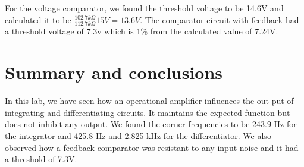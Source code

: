\documentclass[11pt,letterpaper,onecolumn]{article}
\begin{document}
For the voltage comparator, we found the threshold voltage to be 14.6V and calculated it to be $\frac{102.7k\Omega}{112.7k\Omega}15V=13.6V$. The comparator circuit with feedback had a threshold voltage of 7.3v which is 1\% from the calculated value of 7.24V.

\section{Summary and conclusions}

In this lab, we have seen how an operational amplifier influences the out put of integrating and differentiating circuits. It maintains the expected function but does not inhibit any output. We found the corner frequencies to be 243.9 Hz for the integrator and 425.8 Hz and 2.825 kHz for the differentiator. We also observed how a feedback comparator was resistant to any input noise and it had a threshold of 7.3V. 






\end{document}
